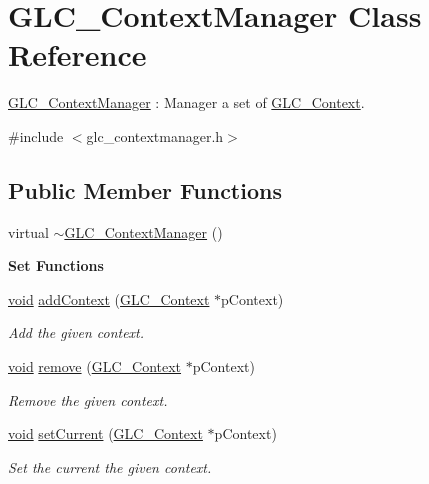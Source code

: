 \hypertarget{class_g_l_c___context_manager}{\section{G\-L\-C\-\_\-\-Context\-Manager Class Reference}
\label{class_g_l_c___context_manager}
}


\hyperlink{class_g_l_c___context_manager}{G\-L\-C\-\_\-\-Context\-Manager} \-: Manager a set of \hyperlink{class_g_l_c___context}{G\-L\-C\-\_\-\-Context}.  




{\ttfamily \#include $<$glc\-\_\-contextmanager.\-h$>$}

\subsection*{Public Member Functions}
\begin{DoxyCompactItemize}
\item 
virtual \hyperlink{class_g_l_c___context_manager_aa87f31b171dea07d6ff26e50be03ce7a}{$\sim$\-G\-L\-C\-\_\-\-Context\-Manager} ()
\end{DoxyCompactItemize}
\begin{Indent}{\bf Set Functions}\par
\begin{DoxyCompactItemize}
\item 
\hyperlink{group___u_a_v_objects_plugin_ga444cf2ff3f0ecbe028adce838d373f5c}{void} \hyperlink{class_g_l_c___context_manager_a3194df9ab465dfe21545137ad0cce103}{add\-Context} (\hyperlink{class_g_l_c___context}{G\-L\-C\-\_\-\-Context} $\ast$p\-Context)
\begin{DoxyCompactList}\small\item\em Add the given context. \end{DoxyCompactList}\item 
\hyperlink{group___u_a_v_objects_plugin_ga444cf2ff3f0ecbe028adce838d373f5c}{void} \hyperlink{class_g_l_c___context_manager_acb9be35c85b08288544598be9a16f577}{remove} (\hyperlink{class_g_l_c___context}{G\-L\-C\-\_\-\-Context} $\ast$p\-Context)
\begin{DoxyCompactList}\small\item\em Remove the given context. \end{DoxyCompactList}\item 
\hyperlink{group___u_a_v_objects_plugin_ga444cf2ff3f0ecbe028adce838d373f5c}{void} \hyperlink{class_g_l_c___context_manager_adf6fb5fbe5ff3c8df91dce9b53fba4da}{set\-Current} (\hyperlink{class_g_l_c___context}{G\-L\-C\-\_\-\-Context} $\ast$p\-Context)
\begin{DoxyCompactList}\small\item\em Set the current the given context. \end{DoxyCompactList}\end{DoxyCompactItemize}
\end{Indent}
